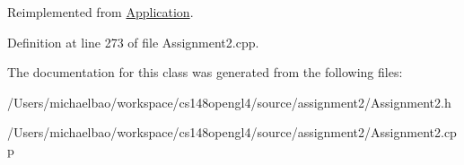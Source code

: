 Reimplemented from \hyperlink{class_application_a0800afd5651153d31fa775a8048d14dd}{Application}.



Definition at line 273 of file Assignment2.\+cpp.



The documentation for this class was generated from the following files\+:\begin{DoxyCompactItemize}
\item 
/\+Users/michaelbao/workspace/cs148opengl4/source/assignment2/Assignment2.\+h\item 
/\+Users/michaelbao/workspace/cs148opengl4/source/assignment2/Assignment2.\+cpp\end{DoxyCompactItemize}
